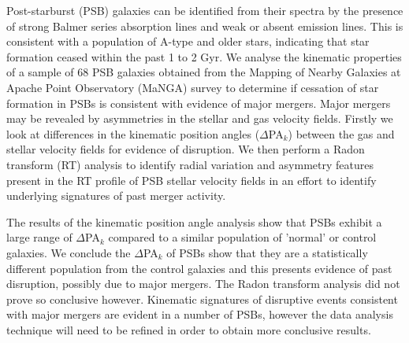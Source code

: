 
Post-starburst (PSB) galaxies can be identified from their spectra by the presence of strong Balmer series absorption lines and weak or absent emission lines. This is consistent with a population of A-type and older stars, indicating that star formation ceased within the past 1 to 2 Gyr. We analyse the kinematic properties of a sample of 68 PSB galaxies obtained from the Mapping of Nearby Galaxies at Apache Point Observatory (MaNGA) survey to determine if cessation of star formation in PSBs is consistent with evidence of major mergers. Major mergers may be revealed by asymmetries in the stellar and gas velocity fields. Firstly we look at differences in the kinematic position angles ($\Delta$PA$_{k}$) between the gas and stellar velocity fields for evidence of disruption. We then perform a Radon transform (RT) analysis to identify radial variation and asymmetry features present in the RT profile of PSB stellar velocity fields in an effort to identify underlying signatures of past merger activity.

The results of the kinematic position angle analysis show that PSBs exhibit a large range of $\Delta$PA$_{k}$ compared to a similar population of 'normal' or control galaxies. We conclude the $\Delta$PA$_{k}$ of PSBs show that they are a statistically different population from the control galaxies and this presents evidence of past disruption, possibly due to major mergers. The Radon transform analysis did not prove so conclusive however. Kinematic signatures of disruptive events consistent with major mergers are evident in a number of PSBs, however the data analysis technique will need to be refined in order to obtain more conclusive results. 


